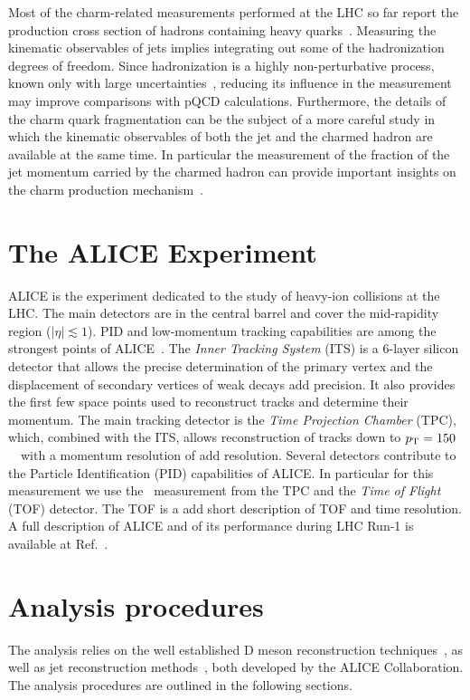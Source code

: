 \documentclass[a4paper]{jpconf}
\begin{document}
Most of the charm-related measurements performed at the LHC so far report the production cross section of hadrons
containing heavy quarks~\cite{ALICE:2012d, ALICE:2012e, ATLAS:2012e, LHCb:2013a, ALICE:2014d, ATLAS:2014e, ALICE:2015c, ALICE:2015d, ALICE:2016a, ATLAS:2016a}.
Measuring the kinematic observables of jets implies integrating out some of the hadronization degrees of freedom. 
Since hadronization is a highly non-perturbative process, known only with large uncertainties~\cite{dEnterria:2014}, 
reducing its influence in the measurement may improve comparisons with pQCD calculations.
Furthermore, the details of the charm quark fragmentation can be the subject of a more careful study in which the kinematic observables 
of both the jet and the charmed hadron are available at the same time. In particular the measurement of the fraction of the jet momentum carried 
by the charmed hadron can provide important insights on the charm production mechanism~\cite{CDF:1990, UA1:1990, STAR:2009a, ATLAS:2012d}.

\section{The ALICE Experiment}
ALICE is the experiment dedicated to the study of heavy-ion collisions at the LHC.
The main detectors are in the central barrel and cover the mid-rapidity region ($\lvert \eta\rvert \lesssim 1$).
PID and low-momentum tracking capabilities are among the strongest points of ALICE~\cite{ALICE:2014b}.
The \emph{Inner Tracking System} (ITS) is a 6-layer silicon detector that allows the precise determination of the primary vertex and the displacement of 
secondary vertices of weak decays {\color{red} add precision}. It also provides the first few space points used to reconstruct tracks and determine their momentum.
The main tracking detector is the \emph{Time Projection Chamber} (TPC), which, combined with the ITS, allows reconstruction of tracks down to $p_{\rm T}=150$~\GeVc\ with a momentum resolution
of {\color{red} add resolution}. Several detectors contribute to the Particle Identification (PID) capabilities of ALICE. In particular for this measurement we use the \dedx\ measurement from the TPC and
the \emph{Time of Flight} (TOF) detector. The TOF is a {\color{red} add short description of TOF and time resolution}.
A full description of ALICE and of its performance during LHC Run-1 is available at Ref.~\cite{ALICE:2014b}.

\section{Analysis procedures}
The analysis relies on the well established D meson reconstruction techniques~\cite{ALICE:2012d, ALICE:2012e, ALICE:2014d, ALICE:2015c, ALICE:2015d, ALICE:2016a}, as well as
jet reconstruction methods~\cite{ALICE:2013c, ALICE:2014a, ALICE:2015e, ALICE:2015f}, both developed by the ALICE Collaboration. The analysis procedures are outlined in the following sections.
\end{document}

